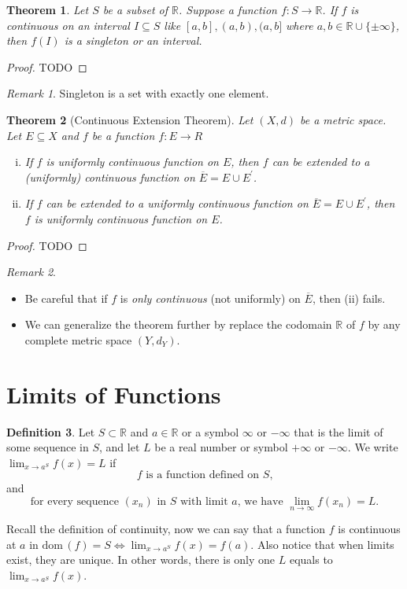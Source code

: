 \documentclass[12pt, lettersize]{book}
\theoremstyle{plain}
\newtheorem{thm}{Theorem}[section]
\theoremstyle{definition}
\newtheorem{dfn}[thm]{Definition}
\theoremstyle{remark}
\newtheorem*{rem}{Remark}
\newcommand{\R}{\mathbb{R}}
\newcommand{\dom}{\text{dom}\,}
\begin{document}
			\begin{thm}
			Let $S$ be a subset of $\R$. Suppose a function $f:S\rightarrow\R$. If $f$ is continuous on an interval $I\subseteq S$ like $[a,b],(a,b),(a,b]$ where $a,b\in\R\cup\{\pm\infty\}$, then $f(I)$ is a singleton or an interval.
			\end{thm}
			\begin{proof}
				TODO
			\end{proof}
			\begin{rem}
				Singleton is a set with exactly one element.
			\end{rem}
			
			\begin{thm}[Continuous Extension Theorem]
			Let $(X,d)$ be a metric space. Let $E\subseteq X$ and $f$ be a function $f:E\rightarrow R$
			\begin{enumerate}[(i)]
				\item If $f$ is uniformly continuous function on $E$, then $f$ can be extended to a (uniformly) continuous function on $\overline{E}=E\cup E^\prime$.
				\item If $f$ can be extended to a uniformly continuous function on $\overline{E}=E\cup E^\prime$, then $f$ is uniformly continuous function on $E$.
			\end{enumerate}
			\end{thm}
			\begin{proof}
				TODO
			\end{proof}
			\begin{rem}
			\begin{itemize}
				\item Be careful that if $f$ is \emph{only continuous} (not uniformly) on $\overline{E}$, then (ii) fails.
				\item We can generalize the theorem further by replace the codomain $\R$ of $f$ by any complete metric space $(Y,d_Y)$.
			\end{itemize}
			\end{rem}
			\newpage
			
		\section{Limits of Functions}
			\begin{dfn}
			Let $S\subset\R$ and $a\in\R$ or a symbol $\infty$ or $-\infty$ that is the limit of some sequence in $S$, and let $L$ be a real number or symbol $+\infty$ or $-\infty$. We write $\lim_{x\rightarrow a^S} f(x)=L$ if
			\begin{displaymath}
				\text{$f$ is a function defined on $S$,}
			\end{displaymath}
			and
			\begin{displaymath}
				\text{for every sequence $(x_n)$ in $S$ with limit $a$, we have $\lim_{n\rightarrow\infty}f(x_n)=L$}.
			\end{displaymath}
			\end{dfn}
			Recall the definition of continuity, now we can say that a function $f$ is continuous at $a$ in $\dom(f)=S \iff \lim_{x\rightarrow a^S} f(x)=f(a)$. Also notice that when limits exist, they are unique. In other words, there
			is only one $L$ equals to $\lim_{x\rightarrow a^S} f(x)$.  
			
\end{document}
